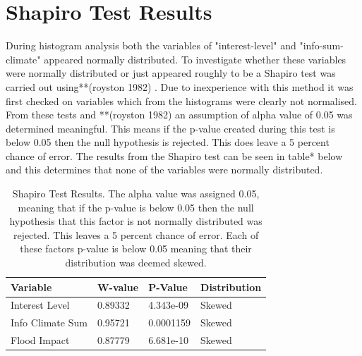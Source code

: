 \section{Shapiro Test Results}

During histogram analysis both the variables of "interest-level" and "info-sum-climate" appeared normally distributed. To investigate whether these variables were normally distributed or just appeared roughly to be a Shapiro test was carried out using**(royston 1982) . Due to inexperience with this method it was first checked on variables which from the histograms were clearly not normalised. From these tests and **(royston 1982) an assumption of alpha value of 0.05 was determined meaningful. This means if the p-value created during this test is below 0.05 then the null hypothesis is rejected. This does leave a 5 percent chance of error. The results from the Shapiro test can be seen in table* below and this determines that none of the variables were normally distributed. 

\begin{table}[h]
    \centering
    \begin{tabular}{|l|l|l|l|}
    \hline
         Variable & W-value & P-Value & Distribution \\ \hline
       Interest Level & 0.89332 & 4.343e-09 & Skewed \\ \hline
         Info Climate Sum  & 0.95721 & 0.0001159 & Skewed \\ \hline
        Flood Impact & 0.87779 & 6.681e-10 & Skewed \\ \hline
     \end{tabular}
    \caption{Shapiro Test Results. The alpha value was assigned 0.05, meaning that if the p-value is below 0.05 then the null hypothesis that this factor is not normally distributed was rejected. This leaves a 5 percent chance of error. Each of these factors p-value is below 0.05 meaning that their distribution was deemed skewed.}
    \label{table:shapiro_test_results}
\end{table}



